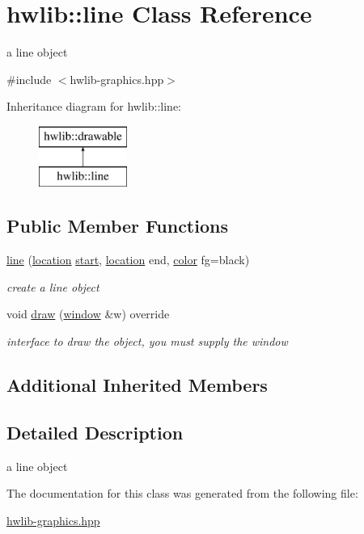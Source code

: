 \hypertarget{classhwlib_1_1line}{}\section{hwlib\+:\+:line Class Reference}
\label{classhwlib_1_1line}


a line object  




{\ttfamily \#include $<$hwlib-\/graphics.\+hpp$>$}

Inheritance diagram for hwlib\+:\+:line\+:\begin{figure}[H]
\begin{center}
\leavevmode
\includegraphics[height=2.000000cm]{classhwlib_1_1line}
\end{center}
\end{figure}
\subsection*{Public Member Functions}
\begin{DoxyCompactItemize}
\item 
\hyperlink{classhwlib_1_1line_a2d016ff29a2b0c6db2976651fbd40c8d}{line} (\hyperlink{classhwlib_1_1location}{location} \hyperlink{classhwlib_1_1drawable_a6c31bc9303840a4317d3c95250c357ce}{start}, \hyperlink{classhwlib_1_1location}{location} end, \hyperlink{classhwlib_1_1color}{color} fg=black)\hypertarget{classhwlib_1_1line_a2d016ff29a2b0c6db2976651fbd40c8d}{}\label{classhwlib_1_1line_a2d016ff29a2b0c6db2976651fbd40c8d}

\begin{DoxyCompactList}\small\item\em create a line object \end{DoxyCompactList}\item 
void \hyperlink{classhwlib_1_1line_a0a30c7c7e88377aada5ee1ec422bfc84}{draw} (\hyperlink{classhwlib_1_1window}{window} \&w) override\hypertarget{classhwlib_1_1line_a0a30c7c7e88377aada5ee1ec422bfc84}{}\label{classhwlib_1_1line_a0a30c7c7e88377aada5ee1ec422bfc84}

\begin{DoxyCompactList}\small\item\em interface to draw the object, you must supply the window \end{DoxyCompactList}\end{DoxyCompactItemize}
\subsection*{Additional Inherited Members}


\subsection{Detailed Description}
a line object 

The documentation for this class was generated from the following file\+:\begin{DoxyCompactItemize}
\item 
\hyperlink{hwlib-graphics_8hpp}{hwlib-\/graphics.\+hpp}\end{DoxyCompactItemize}
